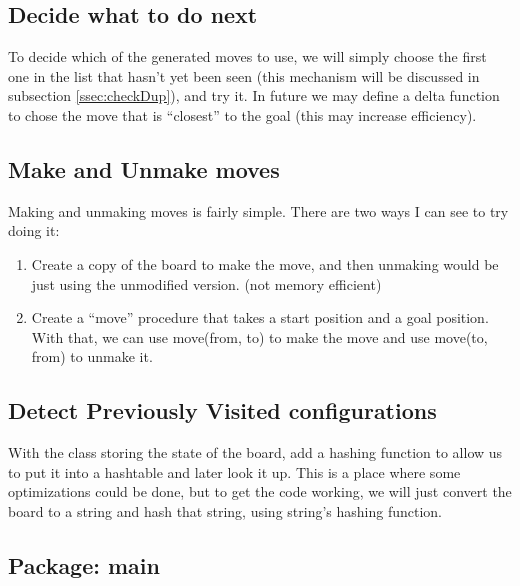 \documentclass[a4paper]{article}
\newcommand{\sourceRoot}{../src/}
\newcommand{\myPackage}{}
\newcommand{\myJPackage}{}
\newcommand{\sourcePackage}[2]{\subsection*{Package: #2}\renewcommand{\myPackage}{#1}\renewcommand{\myJPackage}{#2}}
\newcommand{\sourceClass}[1]{}
\begin{document}
\subsection{Decide what to do next}
To decide which of the generated moves to use, we will simply choose the first one in the list that hasn't yet been seen (this mechanism will be discussed in subsection \ref{ssec:checkDup}), and try it. In future we may define a delta function to chose the move that is ``closest'' to the goal (this may increase efficiency).

\subsection{Make and Unmake moves}
Making and unmaking moves is fairly simple. There are two ways I can see to try doing it: 
\begin{enumerate}
\item Create a copy of the board to make the move, and then unmaking would be just using the unmodified version.  (not memory efficient)
\item Create a ``move'' procedure that takes a start position and a goal position. With that, we can use move(from, to) to make the move and use move(to, from) to unmake it. 
\end{enumerate}

\subsection{Detect Previously Visited configurations}
With the class storing the state of the board, add a hashing function to allow us to put it into a hashtable and later look it up. This is a place where some optimizations could be done, but to get the code working, we will just convert the board to a string and hash that string, using string's hashing function. 
\label{ssec:checkDup}
\sourcePackage{.}{main}
\sourceClass{Solver.java}
\sourceClass{Solver.java}
\sourceClass{Solver.java}
\sourceClass{Solver.java}
\sourceClass{Solver.java}
\end{document}
